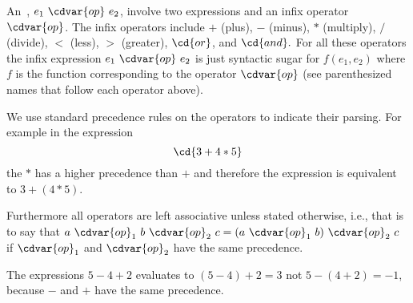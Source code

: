 \begin{cluster}
\label{grp:grm:sparc::infix-expressions}

\begin{gram}
\label{grm:sparc::infix-expressions}
An~, $e_1~\cdvar{op}~e_2$, involve two expressions
and an infix operator $\cdvar{op}$.  The infix operators include $+$
(plus), $-$ (minus), $*$ (multiply), $/$ (divide),
$<$ (less), $>$ (greater), $\cd{or}$, and $\cd{and}.$
For all these operators the infix expression
$e_1~\cdvar{op}~e_2$ is just syntactic sugar for $f(e_1, e_2)$ where
$f$ is the function corresponding to the operator $\cdvar{op}$ (see
parenthesized names that follow each operator above).  

We use standard precedence rules on the operators to indicate their
parsing.  For example in the expression
\[
\cd{3 + 4 * 5}
\]
the $*$ has a higher precedence than $+$ and therefore the
expression is equivalent to $3 + (4 * 5)$. 

Furthermore all operators are left associative unless stated
otherwise, i.e., that is to say that $a~\cdvar{op}_1~b~\cdvar{op}_2~c =
(a~\cdvar{op}_1~b)~\cdvar{op}_2~c$ if $\cdvar{op}_1$ and $\cdvar{op}_2$ have the
same precedence.  

\end{gram}
\end{cluster}

\begin{cluster}
\label{grp:xmpl:sparc::expressions}

\begin{example}
\label{xmpl:sparc::expressions}
The expressions $5 - 4 + 2$ evaluates to $(5-4) + 2 = 3$ not
$5 - (4 + 2) = -1$, because $-$ and $+$ have the same
precedence.

\end{example}
\end{cluster}

